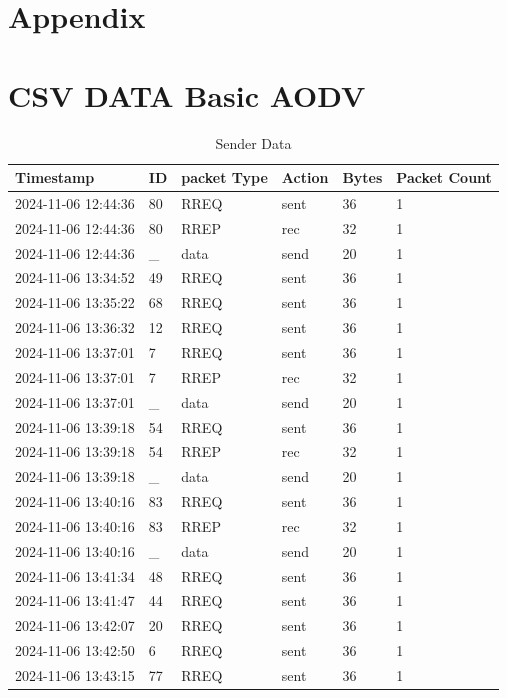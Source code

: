 \documentclass[]{nsm-thesis}
\begin{document}
\chapter*{Appendix}
\chapter{CSV DATA Basic AODV}





\begin{longtable}{llllll}
\caption{Sender Data} \label{tab:sender} \\
\toprule
Timestamp & ID & packet Type & Action & Bytes & Packet Count \\
\midrule
2024-11-06 12:44:36 & 80 & RREQ & sent & 36 & 1 \\
2024-11-06 12:44:36 & 80 & RREP & rec & 32 & 1 \\
2024-11-06 12:44:36 & _ & data & send & 20 & 1 \\
2024-11-06 13:34:52 & 49 & RREQ & sent & 36 & 1 \\
2024-11-06 13:35:22 & 68 & RREQ & sent & 36 & 1 \\
2024-11-06 13:36:32 & 12 & RREQ & sent & 36 & 1 \\
2024-11-06 13:37:01 & 7 & RREQ & sent & 36 & 1 \\
2024-11-06 13:37:01 & 7 & RREP & rec & 32 & 1 \\
2024-11-06 13:37:01 & _ & data & send & 20 & 1 \\
2024-11-06 13:39:18 & 54 & RREQ & sent & 36 & 1 \\
2024-11-06 13:39:18 & 54 & RREP & rec & 32 & 1 \\
2024-11-06 13:39:18 & _ & data & send & 20 & 1 \\
2024-11-06 13:40:16 & 83 & RREQ & sent & 36 & 1 \\
2024-11-06 13:40:16 & 83 & RREP & rec & 32 & 1 \\
2024-11-06 13:40:16 & _ & data & send & 20 & 1 \\
2024-11-06 13:41:34 & 48 & RREQ & sent & 36 & 1 \\
2024-11-06 13:41:47 & 44 & RREQ & sent & 36 & 1 \\
2024-11-06 13:42:07 & 20 & RREQ & sent & 36 & 1 \\
2024-11-06 13:42:50 & 6 & RREQ & sent & 36 & 1 \\
2024-11-06 13:43:15 & 77 & RREQ & sent & 36 & 1 \\

\end{longtable}
\end{document}
